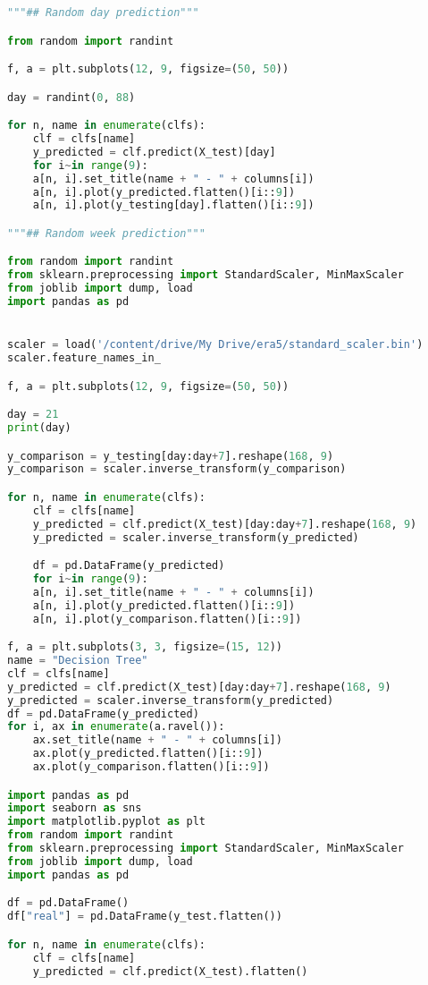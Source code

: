 \begin{lstlisting}[label=python-listing,caption={Kod źródłowy},language=python]
"""## Random day prediction"""

from random import randint

f, a = plt.subplots(12, 9, figsize=(50, 50))

day = randint(0, 88)

for n, name in enumerate(clfs):
    clf = clfs[name]
    y_predicted = clf.predict(X_test)[day]
    for i~in range(9):
    a[n, i].set_title(name + " - " + columns[i])
    a[n, i].plot(y_predicted.flatten()[i::9])
    a[n, i].plot(y_testing[day].flatten()[i::9])

"""## Random week prediction"""

from random import randint
from sklearn.preprocessing import StandardScaler, MinMaxScaler
from joblib import dump, load
import pandas as pd


scaler = load('/content/drive/My Drive/era5/standard_scaler.bin')
scaler.feature_names_in_

f, a = plt.subplots(12, 9, figsize=(50, 50))

day = 21
print(day)

y_comparison = y_testing[day:day+7].reshape(168, 9)
y_comparison = scaler.inverse_transform(y_comparison)

for n, name in enumerate(clfs):
    clf = clfs[name]
    y_predicted = clf.predict(X_test)[day:day+7].reshape(168, 9)
    y_predicted = scaler.inverse_transform(y_predicted)

    df = pd.DataFrame(y_predicted)
    for i~in range(9):
    a[n, i].set_title(name + " - " + columns[i])
    a[n, i].plot(y_predicted.flatten()[i::9])
    a[n, i].plot(y_comparison.flatten()[i::9])

f, a = plt.subplots(3, 3, figsize=(15, 12))
name = "Decision Tree"
clf = clfs[name]
y_predicted = clf.predict(X_test)[day:day+7].reshape(168, 9)
y_predicted = scaler.inverse_transform(y_predicted)
df = pd.DataFrame(y_predicted)
for i, ax in enumerate(a.ravel()):
    ax.set_title(name + " - " + columns[i])
    ax.plot(y_predicted.flatten()[i::9])
    ax.plot(y_comparison.flatten()[i::9])

import pandas as pd
import seaborn as sns
import matplotlib.pyplot as plt
from random import randint
from sklearn.preprocessing import StandardScaler, MinMaxScaler
from joblib import dump, load
import pandas as pd

df = pd.DataFrame()
df["real"] = pd.DataFrame(y_test.flatten())

for n, name in enumerate(clfs):
    clf = clfs[name]
    y_predicted = clf.predict(X_test).flatten()


\end{lstlisting}
